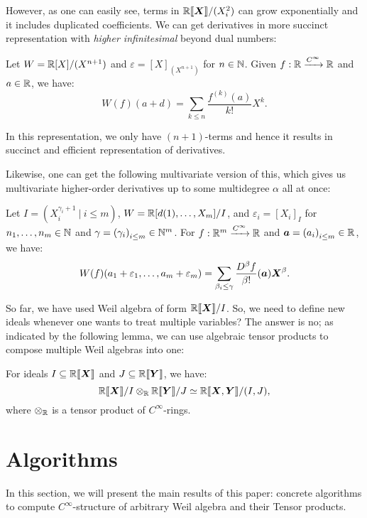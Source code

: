 \documentclass[%
  sigconf,authorversion,screen]{acmart}
\begin{document}
However, as one can easily see, terms in $\mathord{\mathbb{R}\llbracket\boldsymbol{X}\rrbracket}/(X_i^2)$ can grow exponentially and it includes duplicated coefficients.
We can get derivatives in more succinct representation with \emph{higher infinitesimal} beyond dual numbers:

\begin{lemma}\label{lem:higher-infinitesimal}
  Let $W = \mathbb{R}[X]/(X^{n + 1})$ and $\varepsilon = {[X]}_{(X^{n+1})}$ for $n \in \mathbb{N}$.
  Given $f: \mathbb{R} \xrightarrow{C^\infty} \mathbb{R}$ and $a \in \mathbb{R}$, we have:
  \[
    W(f)(a + d)
    = \sum_{k \leq n} \frac{f^{(k)}(a)}{k !} X^k.
  \]
\end{lemma}
In this representation, we only have $(n + 1)$-terms and hence it results in succinct and efficient representation of derivatives.

Likewise, one can get the following multivariate version of this, which gives us multivariate higher-order derivatives up to some multidegree $\alpha$ all at once:
\begin{lemma}
  Let $I = (X_i^{\gamma_i + 1}\ |\ i \leq m )$, $W = \mathbb{R}[d(1), \dots, X_m]/I$, and $\varepsilon_i = {[X_i]}_I$ for $n_1, \dots, n_m \in \mathbb{N}$ and $\gamma = {(\gamma_i)}_{i \leq m} \in \mathbb{N}^m$.
  For $f: \mathbb{R}^m \xrightarrow{C^\infty} \mathbb{R}$ and $\boldsymbol{a} = {(a_i)}_{i \leq m} \in \mathbb{R}$, we have:
  \[
    W(f)(a_1 + \varepsilon_1, \dots, a_m + \varepsilon_m) =
      \sum_{\beta_i \leq \gamma} 
      \frac{D^\beta f}{\beta !}(\boldsymbol{a}) \boldsymbol{X}^\beta.
  \]
\end{lemma}

So far, we have used Weil algebra of form $\mathord{\mathbb{R}\llbracket\boldsymbol{X}\rrbracket}/I$.
So, we need to define new ideals whenever one wants to treat multiple variables?
The answer is no; as indicated by the following lemma, we can use algebraic tensor products to compose multiple Weil algebras into one:

\begin{lemma}
  \label{thm:quot-tensor}
  For ideals $I \subseteq \mathbb{R}\llbracket\boldsymbol{X}\rrbracket$ and $J \subseteq \mathbb{R}\llbracket{}\boldsymbol{Y}\rrbracket$, we have:
  \[
    \mathord{\mathbb{R}\llbracket\boldsymbol{X}\rrbracket}/I \otimes_{\mathbb{R}} \mathbb{R}\llbracket{}\boldsymbol{Y}\rrbracket/J \simeq
    \mathbb{R}\llbracket{}\boldsymbol{X}, \boldsymbol{Y}\rrbracket/(I, J),
  \]
  where $\otimes_{\mathbb{R}}$ is a tensor product of $C^\infty$-rings.
\end{lemma}


\section{Algorithms}\label{sec:alg}
In this section, we will present the main results of this paper: concrete algorithms to compute $C^\infty$-structure of arbitrary Weil algebra and their Tensor products.
\end{document}
